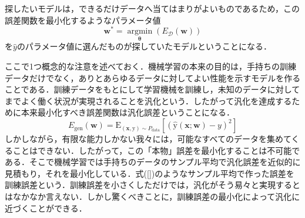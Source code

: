 \documentclass[a4paper,11pt]{jsreport}
\begin{document}
探したいモデルは，できるだけデータへ当てはまりがよいものであるため，この誤差関数を最小化するようなパラメータ値
\begin{equation}
  \bm{w}^* = \underset{\bm{\theta}} {\operatorname{argmin}} (E_{\mathcal{D}}(\bm{w}))
\end{equation}
を$\hat{y}$のパラメータ値に選んだものが探していたモデルということになる．\par
ここで1つ概念的な注意を述べておく．機械学習の本来の目的は，手持ちの訓練データだけでなく，ありとあらゆるデータに対してよい性能を示すモデルを作ることである．訓練データをもとにして学習機械を訓練し，未知のデータに対してまでよく働く状況が実現されることを汎化という．したがって汎化を達成するために本来最小化すべき誤差関数は汎化誤差ということになる．
\begin{equation}
  E_{\text{gen}}(\bm{w}) 
  = \mathrm{E}_{(\mathbf{x}, \mathrm{y}) \sim P_{\text{data}}} \left[ (\hat{\mathrm{y}}(\mathbf{x}; \bm{w}) - y)^2 \right]
\end{equation}
しかしながら，有限な能力しかない我々には，可能なすべてのデータを集めてくることはできない．したがって，この「本物」誤差を最小化することは不可能である．そこで機械学習では手持ちのデータのサンプル平均で汎化誤差を近似的に見積もり，それを最小化している．式(\ref{})のようなサンプル平均で作った誤差を訓練誤差という．訓練誤差を小さくしただけでは，汎化がそう易々と実現するとはなかなか言えない．しかし驚くべきことに，訓練誤差の最小化によって汎化に近づくことができる．
\end{document}
